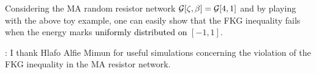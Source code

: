 \documentclass[12pt,a4paper,reqno]{amsart}
\newcommand{\cG}{\ensuremath{\mathcal G}}
\let\a=\alpha \let\b=\beta   \let\d=\delta  \let\e=\varepsilon
\newcommand{\orc}{\textcolor{black}} %
\newcommand{\club}{$\clubsuit$}
\newcommand{\be}{\begin{equation}}
\newcommand{\en}{\end{equation}}
\begin{document}
Considering the MA random resistor network  $\cG [ \z,\b]=\cG[4,1]$ and 
by playing with the above toy example, one can easily  show that the FKG inequality fails when the energy marks \orc{uniformly distributed on} $[-1,1]$. 

%  
% 
% 
%



\bigskip

\smallskip {}:  I thank Hlafo Alfie Mimun for useful simulations concerning  the violation of the FKG inequality in the MA resistor network. 
\end{document}
